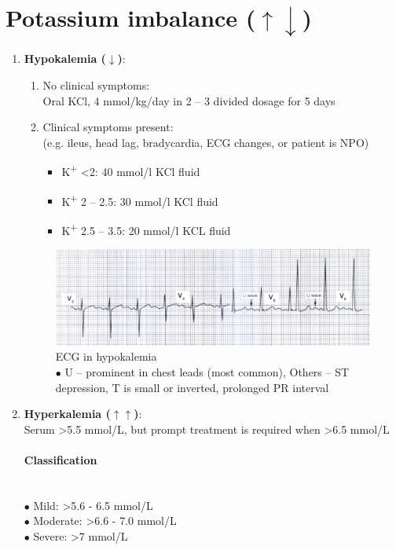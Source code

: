 \documentclass[11pt,a4paper]{report}
\begin{document}
\section[Potassium imbalance]{Potassium imbalance ({\color{red}$\uparrow\downarrow$})}
\begin{enumerate}
	\item \textbf{Hypokalemia ($\downarrow$)}: 
	\begin{enumerate}
		\item No clinical symptoms: \\
		Oral KCl, 4 mmol/kg/day in 2 -- 3 divided dosage for 5 days 
		\item Clinical symptoms present:\\
		(e.g. ileus, head lag, bradycardia, ECG changes, or patient is NPO) \\
		\begin{itemize}[noitemsep]
			\item K\textsuperscript{+} \textless 2: 40 mmol/l KCl fluid
			\item K\textsuperscript{+} 2 -- 2.5: 30 mmol/l KCl fluid
			\item K\textsuperscript{+} 2.5 -- 3.5: 20 mmol/l KCL fluid
		\end{itemize}
	\end{enumerate}
	\begin{figure}[htp]
		\centering \includegraphics[scale=.94]{ecg-hypok.png}
		\centering \caption[Hypokalemia]{ECG in hypokalemia \\ $\bullet$ U -- prominent in chest leads (most common), Others -- ST depression, T is small or inverted, prolonged PR interval \cite{abdullah-ecg}}
		\label{ecg-hypoK}
	\end{figure}
	\newpage
	\item \textbf{Hyperkalemia ($\uparrow\uparrow$)}: \\
	Serum  \textgreater5.5 mmol/L, but prompt treatment is required when \textgreater6.5 mmol/L 
	\paragraph{Classification} ~\\
	$\bullet$ Mild: \textgreater5.6 - 6.5 mmol/L \\
	$\bullet$ Moderate: \textgreater6.6 - 7.0 mmol/L \\
	$\bullet$ Severe: \textgreater7 mmol/L 

\end{enumerate}
\end{document}
